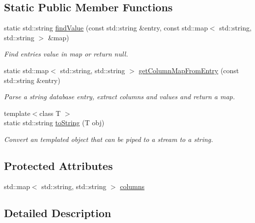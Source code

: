 \subsection*{\-Static \-Public \-Member \-Functions}
\begin{DoxyCompactItemize}
\item 
static std\-::string \hyperlink{classcryomesh_1_1manager_1_1DatabaseObject_aa4ef26ce91fea092f146e67add491e0f}{find\-Value} (const std\-::string \&entry, const std\-::map$<$ std\-::string, std\-::string $>$ \&map)
\begin{DoxyCompactList}\small\item\em \-Find entries value in map or return null. \end{DoxyCompactList}\item 
static std\-::map$<$ std\-::string, \*
std\-::string $>$ \hyperlink{classcryomesh_1_1manager_1_1DatabaseObject_a04ce7c34b51e3290c972121cf2f16565}{get\-Column\-Map\-From\-Entry} (const std\-::string \&entry)
\begin{DoxyCompactList}\small\item\em \-Parse a string database entry, extract columns and values and return a map. \end{DoxyCompactList}\item 
{\footnotesize template$<$class T $>$ }\\static std\-::string \hyperlink{classcryomesh_1_1manager_1_1DatabaseObject_a1b37d9d07009ae1c71f644761d36b468}{to\-String} (\-T obj)
\begin{DoxyCompactList}\small\item\em \-Convert an templated object that can be piped to a stream to a string. \end{DoxyCompactList}\end{DoxyCompactItemize}
\subsection*{\-Protected \-Attributes}
\begin{DoxyCompactItemize}
\item 
std\-::map$<$ std\-::string, \*
std\-::string $>$ \hyperlink{classcryomesh_1_1manager_1_1DatabaseObject_a9c648bf09b9fd8b4d599b0d4f4abf531}{columns}
\end{DoxyCompactItemize}


\subsection{\-Detailed \-Description}



